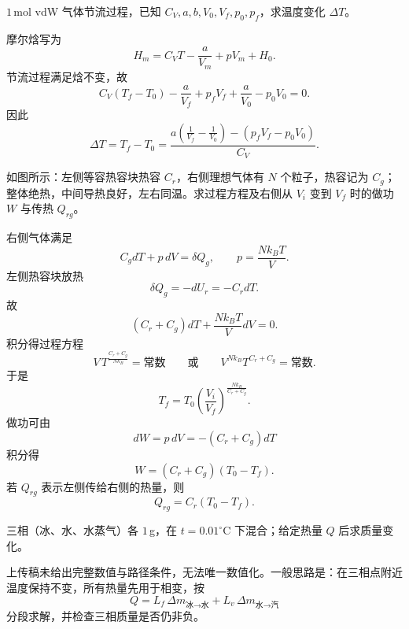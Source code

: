 \begin{question}
$1\,$mol vdW 气体节流过程，已知 $C_V,a,b,V_0,V_f,p_0,p_f$，求温度变化 $\Delta T$。
\begin{solution}
摩尔焓写为
\[
H_m=C_VT-\frac{a}{V_m}+pV_m+H_0.
\]
节流过程满足焓不变，故
\[
C_V(T_f-T_0)-\frac{a}{V_f}+p_fV_f+\frac{a}{V_0}-p_0V_0=0.
\]
因此
\[
\Delta T=T_f-T_0=\frac{a\left(\frac1{V_f}-\frac1{V_0}\right)-\left(p_fV_f-p_0V_0\right)}{C_V}.
\]
\end{solution}
\end{question}

\begin{question}
如图所示：左侧等容热容块热容 $C_r$，右侧理想气体有 $N$ 个粒子，热容记为 $C_g$；整体绝热，中间导热良好，左右同温。求过程方程及右侧从 $V_i$ 变到 $V_f$ 时的做功 $W$ 与传热 $Q_{rg}$。
\begin{solution}
右侧气体满足
\[
C_g dT+p\,dV=\delta Q_g,
\qquad p=\frac{Nk_BT}{V}.
\]
左侧热容块放热
\[
\delta Q_g=-dU_r=-C_r dT.
\]
故
\[
(C_r+C_g)dT+\frac{Nk_BT}{V}dV=0.
\]
积分得过程方程
\[
V\,T^{\frac{C_r+C_g}{Nk_B}}=\text{常数}
\qquad\text{或}\qquad
V^{Nk_B}T^{C_r+C_g}=\text{常数}.
\]
于是
\[
T_f=T_0\left(\frac{V_i}{V_f}\right)^{\frac{Nk_B}{C_r+C_g}}.
\]
做功可由
\[
dW=p\,dV=-(C_r+C_g)dT
\]
积分得
\[
W=(C_r+C_g)(T_0-T_f).
\]
若 $Q_{rg}$ 表示左侧传给右侧的热量，则
\[
Q_{rg}=C_r(T_0-T_f).
\]
\end{solution}
\end{question}

\begin{question}
三相（冰、水、水蒸气）各 $1\,$g，在 $t=0.01^\circ\mathrm C$ 下混合；给定热量 $Q$ 后求质量变化。
\begin{solution}
上传稿未给出完整数值与路径条件，无法唯一数值化。一般思路是：在三相点附近温度保持不变，所有热量先用于相变，按
\[
Q=L_f\,\Delta m_{\text{冰}\to\text{水}}+L_v\,\Delta m_{\text{水}\to\text{汽}}
\]
分段求解，并检查三相质量是否仍非负。
\end{solution}
\end{question}

